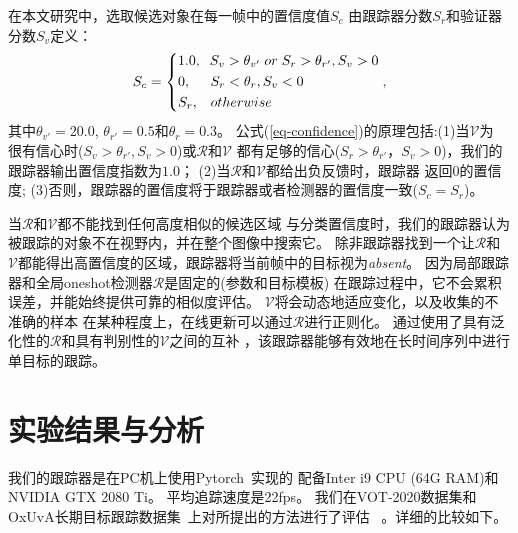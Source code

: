 \documentclass[promaster]{thesis-uestc}
\begin{document}
在本文研究中，选取候选对象在每一帧中的置信度值${S_c}$
由跟踪器分数${S_r}$和验证器分数${S_v}$定义：
\begin{equation}
    {S_c} = \left\{ \begin{gathered}
    1.0,\;\;{S_v} > {\theta _{{v'}}}\;or\;{S_r} > {\theta _{{r'}}},{S_v} > 0 \hfill \\
    0,\;\;\;\;\;{S_r} < {\theta _r},{S_v} < 0 \hfill \\
    {S_r},\;\;\;otherwise \hfill \\ 
    \end{gathered}  \right., 
    \label{eq-confidence}
\end{equation}
其中$\theta_{v'} = 20.0$, $\theta_{r'} = 0.5$和$\theta_r = 0.3$。 
公式(\ref{eq-confidence})的原理包括:(1)当$\mathcal{V}$为
很有信心时($ {S_v} >{\theta _{{r'}}},{S_v} > 0$)或$\mathcal{R} $和$\mathcal{V}$
都有足够的信心(${S_r} > {\theta _{{r'}}}，{S_v} > 0$)，我们的跟踪器输出置信度指数为$1.0$；
(2)当$\mathcal{R}$和$\mathcal{V}$都给出负反馈时，跟踪器
返回$0$的置信度;
(3)否则，跟踪器的置信度将于跟踪器或者检测器的置信度一致($S_c = S_r$)。

当$\mathcal{R}$和$\mathcal{V}$都不能找到任何高度相似的候选区域
与分类置信度时，我们的跟踪器认为被跟踪的对象不在视野内，并在整个图像中搜索它。
除非跟踪器找到一个让$\mathcal{R}$和
$\mathcal{V}$都能得出高置信度的区域，跟踪器将当前帧中的目标视为\emph{absent}。
因为局部跟踪器和全局oneshot检测器$\mathcal{R}$是固定的(参数和目标模板)
在跟踪过程中，它不会累积误差，并能始终提供可靠的相似度评估。
$\mathcal{V}$将会动态地适应变化，以及收集的不准确的样本
在某种程度上，在线更新可以通过$\mathcal{R}$进行正则化。
通过使用了具有泛化性的$\mathcal{R}$和具有判别性的$\mathcal{V}$之间的互补
，该跟踪器能够有效地在长时间序列中进行单目标的跟踪。



\section{实验结果与分析}
我们的跟踪器是在PC机上使用Pytorch~\cite{pytorch}实现的
配备Inter i9 CPU (64G RAM)和NVIDIA GTX 2080 Ti。
平均追踪速度是22fps。
我们在VOT-2020数据集和OxUvA长期目标跟踪数据集~\cite{OxUvA}上对所提出的方法进行了评估~\cite{kristan2019seventh}
。详细的比较如下。
\end{document}
